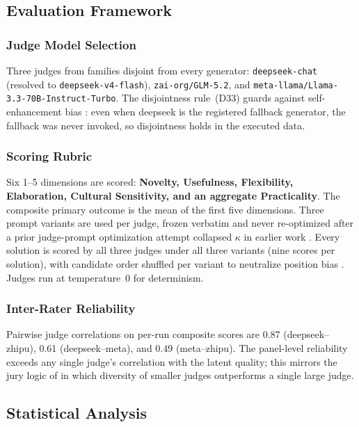 \documentclass[12pt,a4paper]{article}
\begin{document}
\subsection{Evaluation Framework}\label{sec:eval}

\subsubsection{Judge Model Selection}

Three judges from families disjoint from every generator: \texttt{deepseek-chat}
(resolved to \texttt{deepseek-v4-flash}), \texttt{zai-org/GLM-5.2}, and
\texttt{meta-llama/Llama-3.3-70B-Instruct-Turbo}. The disjointness rule~(D33)
guards against self-enhancement bias \citep{ZhengEtAl2023}: even when deepseek
is the registered fallback generator, the fallback was never invoked, so
disjointness holds in the executed data.

\subsubsection{Scoring Rubric}

Six 1--5 dimensions are scored: \textbf{Novelty, Usefulness, Flexibility,
Elaboration, Cultural Sensitivity, and an aggregate Practicality}. The composite
primary outcome is the mean of the first five dimensions. Three prompt variants
are used per judge, frozen verbatim and never re-optimized after a prior
judge-prompt optimization attempt collapsed $\kappa$ in earlier work
\citep{Hariri2025a}. Every solution is scored by all three judges under all
three variants (nine scores per solution), with candidate order shuffled per
variant to neutralize position bias \citep{ZhengEtAl2023}. Judges run at
temperature~0 for determinism.

\subsubsection{Inter-Rater Reliability}

Pairwise judge correlations on per-run composite scores are 0.87
(deepseek--zhipu), 0.61 (deepseek--meta), and 0.49 (meta--zhipu). The
panel-level reliability exceeds any single judge's correlation with the latent
quality; this mirrors the jury logic of \citet{VergaEtAl2024} in which diversity
of smaller judges outperforms a single large judge.

\subsection{Statistical Analysis}
\end{document}
